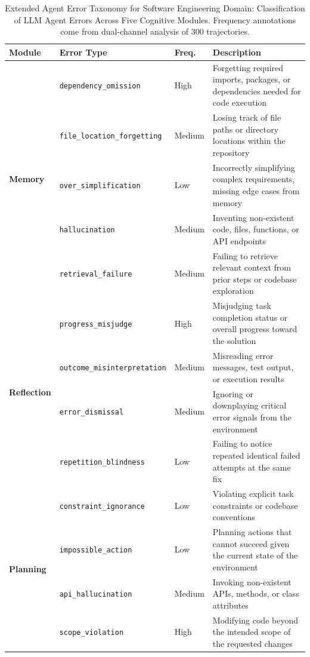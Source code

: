 \documentclass{ieeeaccess}
\begin{document}
\begin{table}[ht!]
\caption{Extended Agent Error Taxonomy for Software Engineering Domain: Classification of LLM Agent Errors Across Five Cognitive Modules. Frequency annotations come from dual-channel analysis of 300 trajectories.}
\label{tab:taxonomy}
\centering
\setlength{\tabcolsep}{3pt}
\renewcommand{\arraystretch}{1.5}
\begin{tabularx}{\textwidth}{|p{}|p{}|p{}|X|}
\hline
\textbf{Module} & \textbf{Error Type} & \textbf{Freq.} & \textbf{Description} \\
\hline

\multirow{5}{*}{\textbf{Memory}}
    & \texttt{dependency\_\allowbreak{}omission}       & High   & Forgetting required imports, packages, or dependencies needed for code execution \\
\cline{2-4}
    & \texttt{file\_location\_\allowbreak{}forgetting} & Medium & Losing track of file paths or directory locations within the repository \\
\cline{2-4}
    & \texttt{over\_\allowbreak{}simplification}       & Low    & Incorrectly simplifying complex requirements, missing edge cases from memory \\
\cline{2-4}
    & \texttt{hallucination}              & Medium & Inventing non-existent code, files, functions, or API endpoints \\
\cline{2-4}
    & \texttt{retrieval\_\allowbreak{}failure}          & Medium    & Failing to retrieve relevant context from prior steps or codebase exploration \\
\hline

\multirow{4}{*}{\textbf{Reflection}}
    & \texttt{progress\_\allowbreak{}misjudge}          & High    & Misjudging task completion status or overall progress toward the solution \\
\cline{2-4}
    & \texttt{outcome\_\allowbreak{}misinterpretation}  & Medium & Misreading error messages, test output, or execution results \\
\cline{2-4}
    & \texttt{error\_dismissal}            & Medium   & Ignoring or downplaying critical error signals from the environment \\
\cline{2-4}
    & \texttt{repetition\_\allowbreak{}blindness}       & Low & Failing to notice repeated identical failed attempts at the same fix \\
\hline

\multirow{4}{*}{\textbf{Planning}}
    & \texttt{constraint\_\allowbreak{}ignorance}       & Low    & Violating explicit task constraints or codebase conventions \\
\cline{2-4}
    & \texttt{impossible\_\allowbreak{}action}          & Low    & Planning actions that cannot succeed given the current state of the environment \\
\cline{2-4}
    & \texttt{api\_\allowbreak{}hallucination}          & Medium & Invoking non-existent APIs, methods, or class attributes \\
\cline{2-4}
    & \texttt{scope\_violation}            & High & Modifying code beyond the intended scope of the requested changes \\
\hline


\end{tabularx}
\end{table}
\end{document}
